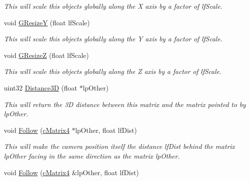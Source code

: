 \begin{DoxyCompactItemize}
\begin{DoxyCompactList}\small\item\em This will scale this objects globally along the X axis by a factor of lfScale. \end{DoxyCompactList}\item 
\hypertarget{classc_camera_matrix4_aa2a9326b7f2a6f00aa5b45057c69ecd3}{
void \hyperlink{classc_camera_matrix4_aa2a9326b7f2a6f00aa5b45057c69ecd3}{GResizeY} (float lfScale)}
\label{classc_camera_matrix4_aa2a9326b7f2a6f00aa5b45057c69ecd3}

\begin{DoxyCompactList}\small\item\em This will scale this objects globally along the Y axis by a factor of lfScale. \end{DoxyCompactList}\item 
\hypertarget{classc_camera_matrix4_a1ab7808cf06ddf7ec373b926c77f85c6}{
void \hyperlink{classc_camera_matrix4_a1ab7808cf06ddf7ec373b926c77f85c6}{GResizeZ} (float lfScale)}
\label{classc_camera_matrix4_a1ab7808cf06ddf7ec373b926c77f85c6}

\begin{DoxyCompactList}\small\item\em This will scale this objects globally along the Z axis by a factor of lfScale. \end{DoxyCompactList}\item 
\hypertarget{classc_camera_matrix4_adf5481b8c761008b9611e0b071e70914}{
uint32 \hyperlink{classc_camera_matrix4_adf5481b8c761008b9611e0b071e70914}{Distance3D} (float $\ast$lpOther)}
\label{classc_camera_matrix4_adf5481b8c761008b9611e0b071e70914}

\begin{DoxyCompactList}\small\item\em This will return the 3D distance between this matrix and the matrix pointed to by lpOther. \end{DoxyCompactList}\item 
\hypertarget{classc_camera_matrix4_aeee787e0f5895a613e8be9efbade408f}{
void \hyperlink{classc_camera_matrix4_aeee787e0f5895a613e8be9efbade408f}{Follow} (\hyperlink{classc_matrix4}{cMatrix4} $\ast$lpOther, float lfDist)}
\label{classc_camera_matrix4_aeee787e0f5895a613e8be9efbade408f}

\begin{DoxyCompactList}\small\item\em This will make the camera position itself the distance lfDist behind the matrix lpOther facing in the same direction as the matrix lpOther. \end{DoxyCompactList}\item 
\hypertarget{classc_camera_matrix4_a0bb6a232830c5e5571677b048cc1c45d}{
void \hyperlink{classc_camera_matrix4_a0bb6a232830c5e5571677b048cc1c45d}{Follow} (\hyperlink{classc_matrix4}{cMatrix4} \&lpOther, float lfDist)}
\label{classc_camera_matrix4_a0bb6a232830c5e5571677b048cc1c45d}


\end{DoxyCompactItemize}
